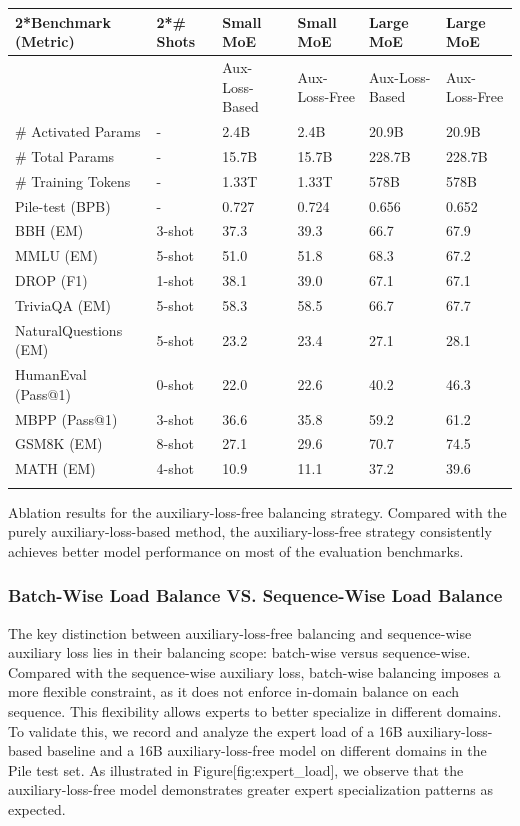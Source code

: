 \documentclass[11pt,a4paper]{article}
\begin{document}
\begin{table}[h]
\begin{tabular}{|l|l|l|l|l|l|}
\hline
2*Benchmark (Metric) & 2*\# Shots & Small MoE & Small MoE & Large MoE & Large MoE \\ \hline
 &  & Aux-Loss-Based & Aux-Loss-Free & Aux-Loss-Based & Aux-Loss-Free \\ \hline
\# Activated Params & - & 2.4B & 2.4B & 20.9B & 20.9B \\ \hline
\# Total Params & - & 15.7B & 15.7B & 228.7B & 228.7B \\ \hline
\# Training Tokens & - & 1.33T & 1.33T & 578B & 578B \\ \hline
Pile-test (BPB) & - & 0.727 & 0.724 & 0.656 & 0.652 \\ \hline
BBH (EM) & 3-shot & 37.3 & 39.3 & 66.7 & 67.9 \\ \hline
MMLU (EM) & 5-shot & 51.0 & 51.8 & 68.3 & 67.2 \\ \hline
DROP (F1) & 1-shot & 38.1 & 39.0 & 67.1 & 67.1 \\ \hline
TriviaQA (EM) & 5-shot & 58.3 & 58.5 & 66.7 & 67.7 \\ \hline
NaturalQuestions (EM) & 5-shot & 23.2 & 23.4 & 27.1 & 28.1 \\ \hline
HumanEval (Pass@1) & 0-shot & 22.0 & 22.6 & 40.2 & 46.3 \\ \hline
MBPP (Pass@1) & 3-shot & 36.6 & 35.8 & 59.2 & 61.2 \\ \hline
GSM8K (EM) & 8-shot & 27.1 & 29.6 & 70.7 & 74.5 \\ \hline
MATH (EM) & 4-shot & 10.9 & 11.1 & 37.2 & 39.6 \\ \hline
 &  &  &  &  &  \\ \hline
\end{tabular}
\end{table}

Ablation results for the auxiliary-loss-free balancing strategy. 
 Compared with the purely auxiliary-loss-based method, the auxiliary-loss-free strategy consistently achieves better model performance on most of the evaluation benchmarks.

\subsubsection{Batch-Wise Load Balance VS. Sequence-Wise Load Balance}

The key distinction between auxiliary-loss-free balancing and sequence-wise auxiliary loss lies in their balancing scope: batch-wise versus sequence-wise. 
Compared with the sequence-wise auxiliary loss, batch-wise balancing imposes a more flexible constraint, as it does not enforce in-domain balance on each sequence. 
This flexibility allows experts to better specialize in different domains. 
To validate this, we record and analyze the expert load of a 16B auxiliary-loss-based baseline and a 16B auxiliary-loss-free model on different domains in the Pile test set.
As illustrated in Figure[fig:expert\_load], we observe that the auxiliary-loss-free model demonstrates greater expert specialization patterns as expected.
\end{document}
